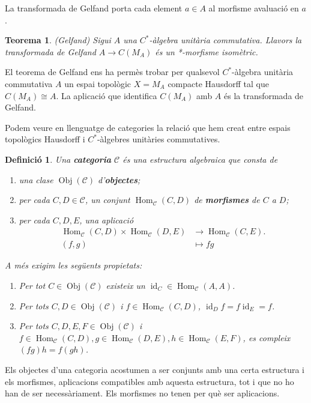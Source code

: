 \documentclass{article}
\newtheorem{teorema}{Teorema}
\newtheorem{definicio}{Definici\'{o}}
\theoremstyle{definition}
\DeclareMathOperator{\Obj}{Obj}
\DeclareMathOperator{\Hom}{Hom}
\DeclareMathOperator{\id}{id}
\begin{document}
La transformada de Gelfand porta cada element $a\in A$ al morfisme avaluaci\'{o} en $a$.

\begin{teorema}
(Gelfand) Sigui $A$ una $C^*$-\`{a}lgebra unit\`{a}ria commutativa. Llavors la transformada de Gelfand $A\rightarrow C(M_A)$ \'{e}s un *-morfisme isom\`{e}tric.
\end{teorema}

El teorema de Gelfand ens ha perm\`{e}s trobar per qualsevol $C^*$-\`{a}lgebra unit\`{a}ria commutativa $A$ un espai topol\`{o}gic $X=M_A$ compacte Hausdorff tal que $C(M_A)\cong A$. La aplicaci\'{o} que identifica $C(M_A)$ amb $A$ \'{e}s la transformada de Gelfand.

Podem veure en llenguatge de categories la relaci\'{o} que hem creat entre espais topol\`{o}gics Hausdorff i $C^*$-\`{a}lgebres unit\`{a}ries commutatives.

\begin{definicio}
Una \textbf{categoria} $\mathcal{C}$ \'{e}s una estructura algebraica que consta de
\begin{enumerate}
\item una clase $\Obj(\mathcal{C})$ d'\textbf{objectes};
\item per cada $C,D\in\mathcal{C}$, un conjunt $\Hom_{\mathcal{C}}(C,D)$ de \textbf{morfismes} de $C$ a $D$;
\item per cada $C,D,E$, una aplicaci\'{o}
\begin{align*}
\Hom_{\mathcal{C}}(C,D)\times\Hom_{\mathcal{C}}(D,E)&\longrightarrow\Hom_{\mathcal{C}}(C,E).\\
(f,g)&\longmapsto fg
\end{align*}
\end{enumerate}
A m\'{e}s exigim les seg\"{u}ents propietats:
\begin{enumerate}
\item Per tot $C\in\Obj(\mathcal{C})$ existeix un $\id_C\in\Hom_{\mathcal{C}}(A,A)$.
\item Per tots $C,D\in\Obj(\mathcal{C})$ i $f\in\Hom_{\mathcal{C}}(C,D)$, $\id_Df=f\id_E=f$.
\item Per tots $C,D,E,F\in\Obj(\mathcal{C})$ i $f\in\Hom_{\mathcal{C}}(C,D),g\in\Hom_{\mathcal{C}}(D,E),h\in\Hom_{\mathcal{C}}(E,F)$, es compleix $(fg)h=f(gh)$.
\end{enumerate}
\end{definicio}

Els objectes d'una categoria acostumen a ser conjunts amb una certa estructura i els morfismes, aplicacions compatibles amb aquesta estructura, tot i que no ho han de ser necess\`{a}riament. Els morfismes no tenen per qu\`{e} ser aplicacions.
\end{document}
